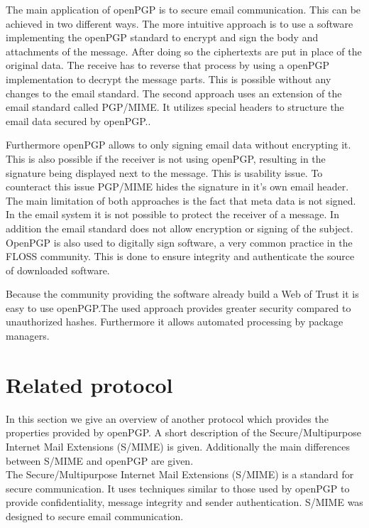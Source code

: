 The main application of openPGP is to secure email communication. This can be achieved in two different ways. The more intuitive approach is to use a software implementing the openPGP standard to encrypt and sign the body and attachments of the message. After doing so the ciphertexts are put in place of the original data. The receive has to reverse that process by using a openPGP implementation to decrypt the message parts. This is possible without any changes to the email standard. The second approach uses an extension of the email standard called PGP/MIME. It utilizes special headers to structure the email data secured by openPGP..

Furthermore openPGP allows to only signing email data without encrypting it. This is also possible if the receiver is not using openPGP, resulting in the signature being displayed next to the message. This is usability issue. To counteract this issue PGP/MIME hides the signature in it's own email header. \\


The main limitation of both approaches is the fact that meta data is not signed. In the email system it is not possible to protect the receiver of a message. In addition the email standard does not allow encryption or signing of the subject. \\

OpenPGP is also used to digitally sign software, a very common practice in the FLOSS community. This is done to ensure integrity and authenticate the source of downloaded software. 

Because the community providing the software already build a Web of Trust it is easy to use openPGP.The used approach provides greater security compared to unauthorized hashes. Furthermore it allows automated processing by package managers.

\section{Related protocol} \label{section:openpgp:smime}

In this section we give an overview of another protocol which provides the properties provided by openPGP. A short description of the Secure/Multipurpose Internet Mail Extensions (S/MIME) is given. Additionally the main differences between S/MIME and openPGP are given. \\

The Secure/Multipurpose Internet Mail Extensions (S/MIME) is a standard for secure communication. It uses techniques similar to those used by openPGP to provide confidentiality, message integrity and sender authentication. S/MIME was designed to secure email communication.  \\

